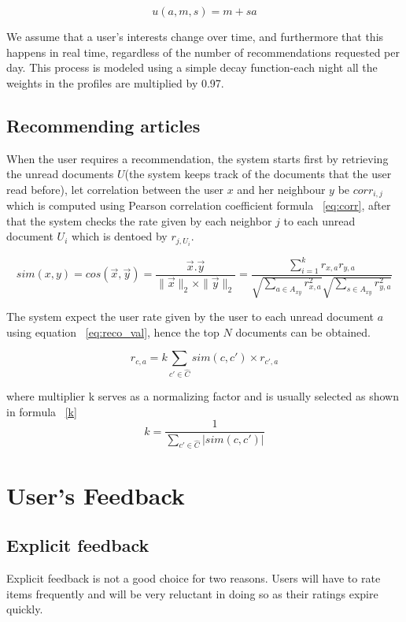\begin{equation}
u(a,m,s) =m+sa
\label{eq:feedback}
\end{equation}

We assume that a user's interests change over time, and furthermore that this happens in real time, regardless of the number of recommendations requested per day. This process is modeled using a simple decay function-each night all the weights in the profiles are multiplied by 0.97.

\subsection{Recommending articles}
 When the user requires a recommendation, the system starts first by retrieving the unread documents $U$(the system keeps track of the documents that the user read before), let correlation between the user $x$ and her neighbour $y$ be $corr_{i,j}$ which is computed using Pearson correlation coefficient formula ~\ref{eq:corr}, after that the system checks the rate given by each neighbor $j$ to each unread document $U_i$ which is dentoed by $r_{j,U_i}$. 
 
 \begin{equation}\label{eq:corr}
sim(x,y)= cos(\vec{x}  ,\vec {y}) = \frac{\vec{x} . \vec {y}} {\|\vec{x}\|_2 \times \|\vec{y}\|_2 } = 
\frac{\sum _{i=1}^{k}r_{x,a}r_{y,a} }{\sqrt {\sum_{a\in A_{xy}}r^{2}_{x,a}}{\sqrt {\sum_{s\in A_{xy}}r^{2}_{y,a}}}}
\end{equation}

The system expect the user rate given by the user to each unread document $a$ using equation ~\ref{eq:reco_val}, hence the top $N$ documents can be obtained.

\begin{equation}\label{eq:reco_val}
r_{c,a}= k\sum_{ c'\in \hat{C}} sim(c,c')\times r_{c',a}
\end{equation}


where multiplier k serves as a normalizing factor and is usually selected as shown in formula ~\ref{k}
\begin{equation}\label{k}
k = \frac{1}{\sum_{c' \in \hat{C}} |sim(c,c')|}
\end{equation}

 
\section{User's Feedback}\label{feedback}
\subsection{Explicit feedback}
Explicit feedback is not a good choice for two reasons. Users will have to rate items frequently and will be very reluctant in doing so as their ratings expire quickly.

